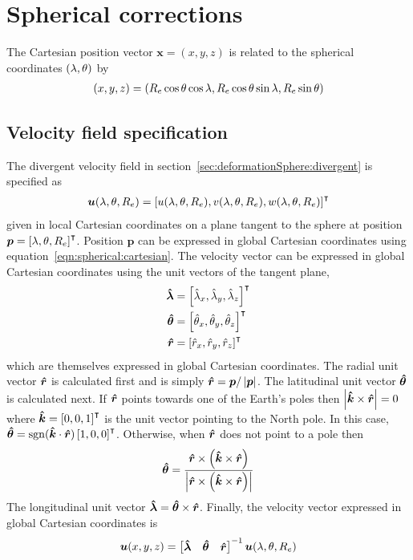 \section{Spherical corrections}
The Cartesian position vector $\bm{x} = (x,y,z)$ is related to the spherical coordinates $(\lambda, \theta)$ by
\begin{align}
	(x,y,z) = (R_e \cos \theta \cos \lambda, R_e \cos \theta \sin \lambda, R_e \sin \theta) \label{eqn:spherical:cartesian}
\end{align}

\subsection{Velocity field specification}
The divergent velocity field in section~\ref{sec:deformationSphere:divergent} is specified as
\begin{align}
	\bm{u}(\lambda, \theta, R_e) = \left[ 
	u(\lambda, \theta, R_e),
	v(\lambda, \theta, R_e),
	w(\lambda, \theta, R_e)
	\right]^\intercal
\end{align}
given in local Cartesian coordinates on a plane tangent to the sphere at position $\bm{p} = \left[ \lambda, \theta, R_e \right]^\intercal$.  Position $\bm{p}$ can be expressed in global Cartesian coordinates using equation~\eqref{eqn:spherical:cartesian}.
The velocity vector can be expressed in global Cartesian coordinates using the unit vectors of the tangent plane,
\begin{align}
	\bm{\hat{\lambda}} &= \left[ \hat{\lambda}_x, \hat{\lambda}_y, \hat{\lambda}_z \right]^\intercal \\
	\bm{\hat{\theta}} &= \left[ \hat{\theta}_x, \hat{\theta}_y, \hat{\theta}_z \right]^\intercal \\
	\bm{\hat{r}} &= \left[ \hat{r}_x, \hat{r}_y, \hat{r}_z \right]^\intercal
\end{align}
which are themselves expressed in global Cartesian coordinates.
The radial unit vector $\bm{\hat{r}}$ is calculated first and is simply $\bm{\hat{r}} = \bm{p} / \left\lvert \bm{p} \right\rvert$.
The latitudinal unit vector $\bm{\hat{\theta}}$ is calculated next.  If $\bm{\hat{r}}$ points towards one of the Earth's poles then $\left\lvert \bm{\hat{k}} \times \bm{\hat{r}} \right\rvert = 0$ where $\bm{\hat{k}} = \left[0, 0, 1\right]^\intercal$ is the unit vector pointing to the North pole.
In this case, $\bm{\hat{\theta}} = \mathrm{sgn}(\bm{\hat{k}} \cdot \bm{\hat{r}}) \left[1, 0, 0\right]^\intercal$.  Otherwise, when $\bm{\hat{r}}$ does not point to a pole then
\begin{align}
	\bm{\hat{\theta}} = \frac{\bm{\hat{r}} \times \left( \bm{\hat{k}} \times \bm{\hat{r}} \right)}{\left\lvert \bm{\hat{r}} \times \left( \bm{\hat{k}} \times \bm{\hat{r}} \right) \right\rvert}
\end{align}
The longitudinal unit vector $\bm{\hat{\lambda}} = \bm{\hat{\theta}} \times \bm{\hat{r}}$.
Finally, the velocity vector expressed in global Cartesian coordinates is
\begin{align}
	\bm{u}(x, y, z) = 
	\begin{bmatrix}
		\bm{\hat{\lambda}} &
		\bm{\hat{\theta}} &
		\bm{\hat{r}}
	\end{bmatrix}^{-1}
	\bm{u}(\lambda, \theta, R_e)
\end{align}

